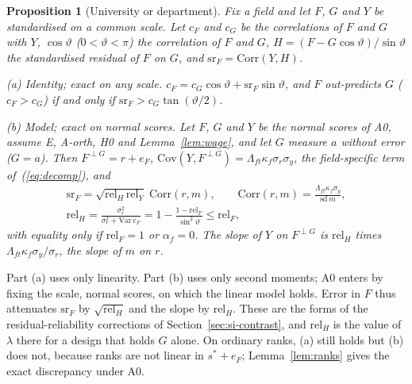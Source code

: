\documentclass[11pt]{article}
\newtheorem{sprop}{Proposition}
\begin{document}
\begin{sprop}[University or department]\label{prop:level}
Fix a field and let $F$, $G$ and $Y$ be standardised on a common scale. Let $c_F$ and $c_G$ be the correlations of $F$
and $G$ with $Y$, $\cos\vartheta$ ($0<\vartheta<\pi$) the correlation of $F$ and $G$,
$H=(F-G\cos\vartheta)/\sin\vartheta$ the standardised residual of $F$ on $G$, and $\mathrm{sr}_F=\mathrm{Corr}(Y,H)$.

(a) \emph{Identity; exact on any scale.} $c_F=c_G\cos\vartheta+\mathrm{sr}_F\sin\vartheta$, and $F$ out-predicts $G$
($c_F>c_G$) if and only if $\mathrm{sr}_F>c_G\tan(\vartheta/2)$.

(b) \emph{Model; exact on normal scores.} Let $F$, $G$ and $Y$ be the normal scores of A0, assume E, A-orth, H0 and
Lemma~\ref{lem:wage}, and let $G$ measure $a$ without error ($G=a$). Then $F^{\perp G}=r+e_F$,
$\mathrm{Cov}(Y,F^{\perp G})=\Lambda_{ft}\kappa_f\sigma_r\sigma_y$, the field-specific term of~(\ref{eq:decomp}), and
\begin{gather*}
\mathrm{sr}_F=\sqrt{\mathrm{rel}_H\,\mathrm{rel}_Y}\;\mathrm{Corr}(r,m),\qquad
\mathrm{Corr}(r,m)=\frac{\Lambda_{ft}\kappa_f\sigma_y}{\mathrm{sd}\,m},\\
\mathrm{rel}_H=\frac{\sigma_r^2}{\sigma_r^2+\mathrm{Var}\,e_F}=1-\frac{1-\mathrm{rel}_F}{\sin^2\vartheta}\le\mathrm{rel}_F,
\end{gather*}
with equality only if $\mathrm{rel}_F=1$ or $\alpha_f=0$. The slope of $Y$ on $F^{\perp G}$ is $\mathrm{rel}_H$ times
$\Lambda_{ft}\kappa_f\sigma_y/\sigma_r$, the slope of $m$ on $r$.
\end{sprop}

Part (a) uses only linearity. Part (b) uses only second moments; A0 enters by fixing the scale, normal scores, on which
the linear model holds. Error in $F$ thus attenuates $\mathrm{sr}_F$ by $\sqrt{\mathrm{rel}_H}$ and the slope by
$\mathrm{rel}_H$. These are the forms of the residual-reliability corrections of Section~\ref{sec:si-contrast}, and
$\mathrm{rel}_H$ is the value of $\lambda$ there for a design that holds $G$ alone. On ordinary ranks, (a) still holds
but (b) does not, because ranks are not linear in $s^*+e_F$; Lemma~\ref{lem:ranks} gives the exact discrepancy under A0.
\end{document}
